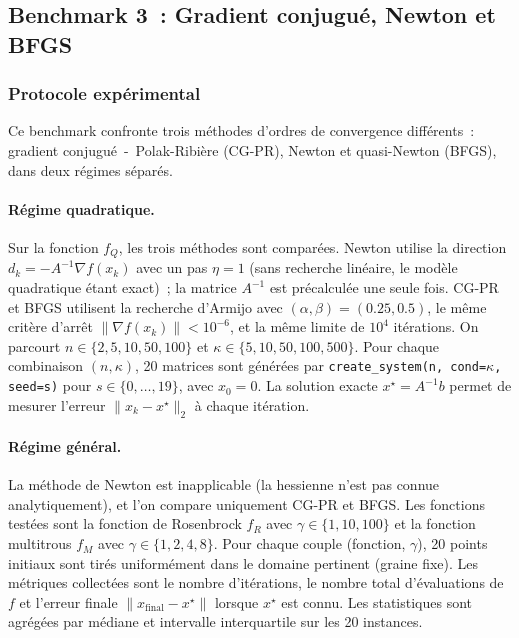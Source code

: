 \documentclass[10pt,a4paper]{article}
\begin{document}
\newpage

\subsection{Benchmark 3~: Gradient conjugué, Newton et BFGS}\label{sec:b3}

\subsubsection{Protocole expérimental}

Ce benchmark confronte trois méthodes d'ordres de convergence différents~: gradient conjugué~-~Polak-Ribière (CG-PR), Newton et quasi-Newton (BFGS), dans deux régimes séparés.

\paragraph{Régime quadratique.} Sur la fonction $f_Q$, les trois méthodes sont comparées. Newton utilise la direction $d_k = -A^{-1}\nabla f(x_k)$ avec un pas $\eta = 1$ (sans recherche linéaire, le modèle quadratique étant exact)~; la matrice $A^{-1}$ est précalculée une seule fois. CG-PR et BFGS utilisent la recherche d'Armijo avec $(\alpha, \beta) = (0.25, 0.5)$, le même critère d'arrêt $\|\nabla f(x_k)\| < 10^{-6}$, et la même limite de $10^4$ itérations. On parcourt $n \in \{2, 5, 10, 50, 100\}$ et $\kappa \in \{5, 10, 50, 100, 500\}$. Pour chaque combinaison $(n, \kappa)$, 20 matrices sont générées par \texttt{create\_system(n, cond=$\kappa$, seed=s)} pour $s \in \{0, \ldots, 19\}$, avec $x_0 = 0$. La solution exacte $x^\star = A^{-1}b$ permet de mesurer l'erreur $\|x_k - x^\star\|_2$ à chaque itération.

\paragraph{Régime général.} La méthode de Newton est inapplicable (la hessienne n'est pas connue analytiquement), et l'on compare uniquement CG-PR et BFGS. Les fonctions testées sont la fonction de Rosenbrock $f_R$ avec $\gamma \in \{1, 10, 100\}$ et la fonction multitrous $f_M$ avec $\gamma \in \{1, 2, 4, 8\}$. Pour chaque couple (fonction, $\gamma$), 20 points initiaux sont tirés uniformément dans le domaine pertinent (graine fixe). Les métriques collectées sont le nombre d'itérations, le nombre total d'évaluations de $f$ et l'erreur finale $\|x_{\text{final}} - x^\star\|$ lorsque $x^\star$ est connu. Les statistiques sont agrégées par médiane et intervalle interquartile sur les 20 instances.
\end{document}
